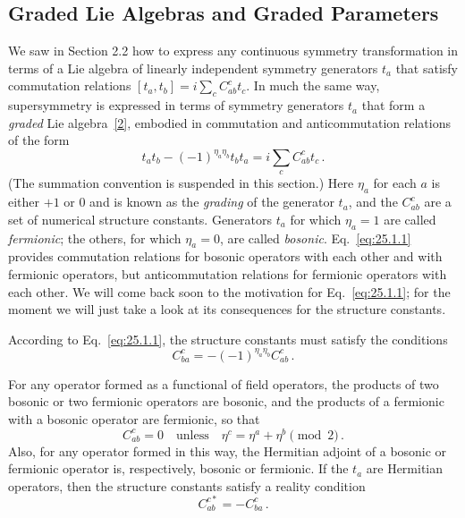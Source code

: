 
\subsection{Graded Lie Algebras and Graded Parameters}

\providecommand{\gradedbracket}[2]{\mathopen{[}#1,#2\mathclose{\}}}

We saw in Section 2.2 how to express any continuous symmetry transformation in
terms of a Lie algebra of linearly independent symmetry generators $t_a$ that
satisfy commutation relations
$[t_a,t_b]=i\sum_c C^c_{ab}t_c$. In much the same way, supersymmetry is
expressed in terms of symmetry generators $t_a$ that form a \emph{graded} Lie
algebra~\hyperref[ch25-ref-2]{[2]}, embodied in commutation and
anticommutation relations of the form
\begin{equation}
  t_at_b-(-1)^{\eta_a\eta_b}t_bt_a
  =i\sum_c C^c_{ab}t_c\,.
  \tag{25.1.1}\label{eq:25.1.1}
\end{equation}
(The summation convention is suspended in this section.) Here $\eta_a$ for
each $a$ is either $+1$ or 0 and is known as the \emph{grading} of the
generator $t_a$, and the $C^c_{ab}$ are a set of numerical structure
constants. Generators $t_a$ for which $\eta_a=1$ are called \emph{fermionic};
the others, for which $\eta_a=0$, are called \emph{bosonic}.
Eq.~\eqref{eq:25.1.1} provides commutation relations for bosonic operators with
each other and with fermionic operators, but anticommutation relations for
fermionic operators with each other. We will come back soon to the motivation
for Eq.~\eqref{eq:25.1.1}; for the moment we will just take a look at its
consequences for the structure constants.

According to Eq.~\eqref{eq:25.1.1}, the structure constants must satisfy the
conditions
\begin{equation}
  C^c_{ba}=-(-1)^{\eta_a\eta_b}C^c_{ab}\,.
  \tag{25.1.2}\label{eq:25.1.2}
\end{equation}

For any operator formed as a functional of field operators, the products of
two bosonic or two fermionic operators are bosonic, and the products of a
fermionic with a bosonic operator are fermionic, so that
\begin{equation}
  C^c_{ab}=0\quad\text{unless}\quad
  \eta^c=\eta^a+\eta^b\pmod 2\,.
  \tag{25.1.3}\label{eq:25.1.3}
\end{equation}
Also, for any operator formed in this way, the Hermitian adjoint of a bosonic
or fermionic operator is, respectively, bosonic or fermionic. If the $t_a$ are
Hermitian operators, then the structure constants satisfy a reality condition
\begin{equation}
  C^{c*}_{ab}=-C^c_{ba}\,.
  \tag{25.1.4}\label{eq:25.1.4}
\end{equation}

